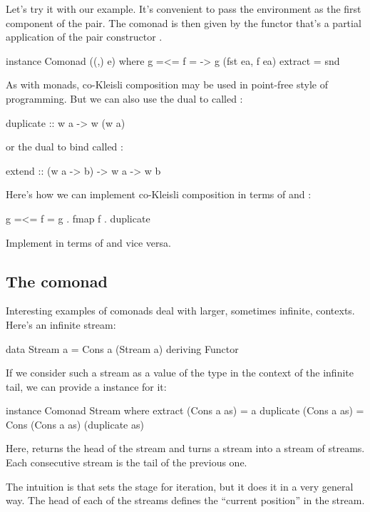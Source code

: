 \documentclass[DaoFP]{subfiles}
\begin{document}
Let's try it with our example. It's convenient to pass the environment as the first component of the pair. The comonad is then given by the functor that's a partial application of the pair constructor .
\begin{haskell}
instance Comonad ((,) e) where
  g =<= f = \ea -> g (fst ea, f ea)
  extract = snd
\end{haskell}

As with monads, co-Kleisli composition may be used in point-free style of programming. But we can also use the dual to  called :
\begin{haskell}
  duplicate :: w a -> w (w a)
\end{haskell}
or the dual to bind called :
\begin{haskell}
  extend :: (w a -> b) -> w a -> w b
\end{haskell}
Here's how we can implement co-Kleisli composition in terms of  and :
\begin{haskell}
   g =<= f = g . fmap f . duplicate
\end{haskell}
\begin{exercise}
Implement  in terms of  and vice versa.
\end{exercise}
\subsection{The  comonad}
Interesting examples of comonads deal with larger, sometimes infinite, contexts. Here's an infinite stream:
\begin{haskell}
data Stream a = Cons a (Stream a)
    deriving Functor
\end{haskell}

If we consider such a stream as a value of the type  in the context of the infinite tail, we can provide a  instance for it:
\begin{haskell}
instance Comonad Stream where
  extract (Cons a as) = a
  duplicate (Cons a as) = Cons (Cons a as) (duplicate as)
\end{haskell}
Here,  returns the head of the stream and  turns a stream into a stream of streams. Each consecutive stream is the tail of the previous one. 

The intuition is that  sets the stage for iteration, but it does it in a very general way. The head of each of the streams defines the ``current position'' in the stream. 
\end{document}
